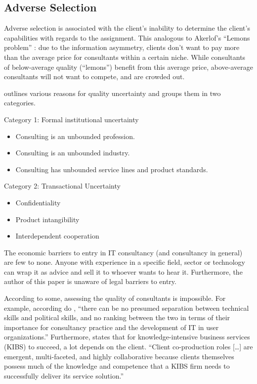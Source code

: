 \documentclass[12pt]{article}
\providecommand{\tightlist}{%
  \setlength{\itemsep}{0pt}\setlength{\parskip}{0pt}}
\begin{document}
\hypertarget{adverse-selection}{%
\subsection{Adverse Selection}\label{adverse-selection}}

Adverse selection is associated with the client's inability to determine
the client's capabilities with regards to the assignment. This analogous
to Akerlof's ``Lemons problem'' \citeyearpar{akerlof1970}: due to the
information asymmetry, clients don't want to pay more than the average
price for consultants within a certain niche. While consultants of
below-average quality (``lemons'') benefit from this average price,
above-average consultants will not want to compete, and are crowded out.

\citep[ 69-75]{armbruster2006} outlines various reasons for quality
uncertainty and groups them in two categories.

Category 1: Formal institutional uncertainty

\begin{itemize}
\tightlist
\item
  Consulting is an unbounded profession.
\item
  Consulting is an unbounded industry.
\item
  Consulting has unbounded service lines and product standards.
\end{itemize}

Category 2: Transactional Uncertainty

\begin{itemize}
\tightlist
\item
  Confidentiality
\item
  Product intangibility
\item
  Interdependent cooperation
\end{itemize}

The economic barriers to entry \citep[ 463]{fee2004} in IT consultancy
(and consultancy in general) are few to none. Anyone with experience in
a specific field, sector or technology can wrap it as advice and sell it
to whoever wants to hear it. Furthermore, the author of this paper is
unaware of legal barriers to entry.

According to some, assessing the quality of consultants is impossible.
For example, according do \citet[40]{bloomfield1995}, ``there can be no
presumed separation between technical skills and political skills, and
no ranking between the two in terms of their importance for consultancy
practice and the development of IT in user organizations.'' Furthermore,
\citet[101-102]{bettencourt2002} states that for knowledge-intensive
business services (KIBS) to succeed, a lot depends on the client.
``Client co-production roles {[}\ldots{]} are emergent, multi-faceted,
and highly collaborative because clients themselves possess much of the
knowledge and competence that a KIBS firm needs to successfully deliver
its service solution.''
\end{document}
